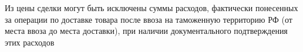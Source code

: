 Из цены сделки могут быть исключены суммы расходов, фактически понесенных за операции по доставке товара после ввоза на таможенную территорию РФ (от места ввоза до места доставки), при наличии документального подтверждения этих расходов















